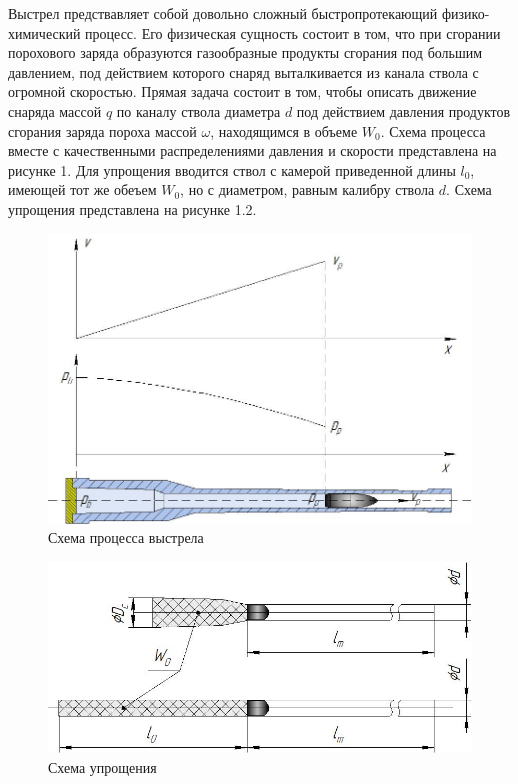 \documentclass[14pt, a4paper]{report} %
\begin{document}
Выстрел предствавляет собой довольно сложный быстропротекающий физико-химический процесс. Его физическая сущность состоит в том, что при сгорании порохового заряда образуются газообразные продукты сгорания под большим давлением, 
под действием которого снаряд выталкивается из канала ствола с огромной скоростью. Прямая задача состоит в том, чтобы описать движение снаряда массой $q$ по каналу ствола диаметра $d$ под действием давления продуктов сгорания заряда пороха массой $\omega$, находящимся в объеме $W_0$. Схема процесса вместе с качественными распределениями давления и скорости представлена на рисунке 1.
Для упрощения вводится ствол с камерой приведенной длины $l_0$, имеющей тот же обеъем $W_0$, но с диаметром, равным калибру ствола $d$. Схема упрощения представлена на рисунке 1.2. 

\begin{figure}[h!]
\centering
\includegraphics[width=0.45\textheight]{imgs/1.jpg}
\caption{Схема процесса выстрела}
\end{figure}

\begin{figure}[h]
\centering
\includegraphics[width=0.5\textheight]{imgs/2.jpg}
\caption{Схема упрощения}
\end{figure}
\end{document}
